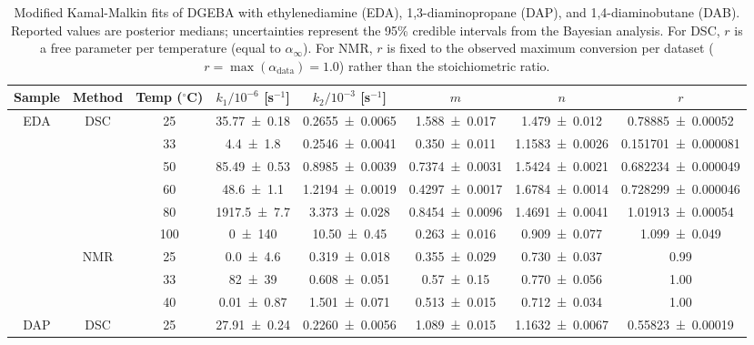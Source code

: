 \begin{table}[!ht]
\caption{Modified Kamal-Malkin fits of DGEBA with ethylenediamine (EDA), 1,3-diaminopropane (DAP), and 1,4-diaminobutane (DAB). Reported values are posterior medians; uncertainties represent the 95\% credible intervals from the Bayesian analysis. For DSC, $r$ is a free parameter per temperature (equal to $\alpha_\infty$). For NMR, $r$ is fixed to the observed maximum conversion per dataset ($r = \max(\alpha_\mathrm{data}) =1.0$) rather than the stoichiometric ratio.}
\label{tab:KM_with_r}
    \centering
    \begin{tabular}{c|cc ccccc}
        Sample & Method & Temp ($^\circ$C) & $k_1/10^{-6}$ [s$^{-1}$] & $k_2/10^{-3}$ [s$^{-1}$] & $m$ & $n$ & $r$ \\ \midrule
        \multirow{9}{*}{EDA} & \multirow{6}{*}{DSC} & 25 & \num{35.77 \pm 0.18} & \num{0.2655 \pm 0.0065} & \num{1.588 \pm 0.017} & \num{1.479 \pm 0.012} & \num{0.78885 \pm 0.00052} \\
        ~ & ~ & 33 & \num{4.4 \pm 1.8} & \num{0.2546 \pm 0.0041} & \num{0.350 \pm 0.011} & \num{1.1583 \pm 0.0026} & \num{0.151701 \pm 0.000081} \\
        ~ & ~ & 50 & \num{85.49 \pm 0.53} & \num{0.8985 \pm 0.0039} & \num{0.7374 \pm 0.0031} & \num{1.5424 \pm 0.0021} & \num{0.682234 \pm 0.000049} \\
        ~ & ~ & 60 & \num{48.6 \pm 1.1} & \num{1.2194 \pm 0.0019} & \num{0.4297 \pm 0.0017} & \num{1.6784 \pm 0.0014} & \num{0.728299 \pm 0.000046} \\
        ~ & ~ & 80 & \num{1917.5 \pm 7.7} & \num{3.373 \pm 0.028} & \num{0.8454 \pm 0.0096} & \num{1.4691 \pm 0.0041} & \num{1.01913 \pm 0.00054} \\
        ~ & ~ & 100 & \num{0 \pm 140} & \num{10.50 \pm 0.45} & \num{0.263 \pm 0.016} & \num{0.909 \pm 0.077} & \num{1.099 \pm 0.049} \\
        \cline{2-8}
        ~ & \multirow{3}{*}{NMR} & 25 & \num{0.0 \pm 4.6} & \num{0.319 \pm 0.018} & \num{0.355 \pm 0.029} & \num{0.730 \pm 0.037} & 0.99 \\
        ~ & ~ & 33 & \num{82 \pm 39} & \num{0.608 \pm 0.051} & \num{0.57 \pm 0.15} & \num{0.770 \pm 0.056} & 1.00 \\
        ~ & ~ & 40 & \num{0.01 \pm 0.87} & \num{1.501 \pm 0.071} & \num{0.513 \pm 0.015} & \num{0.712 \pm 0.034} & 1.00 \\
    \midrule
        \multirow{12}{*}{DAP} & \multirow{6}{*}{DSC} & 25 & \num{27.91 \pm 0.24} & \num{0.2260 \pm 0.0056} & \num{1.089 \pm 0.015} & \num{1.1632 \pm 0.0067} & \num{0.55823 \pm 0.00019} \\

\end{tabular}
\end{table}
